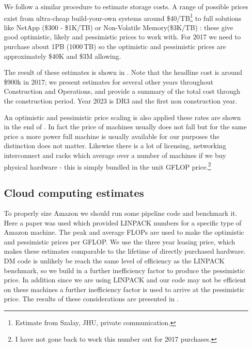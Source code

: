 We follow a similar procedure to estimate storage costs. A range of possible prices exist from ultra-cheap build-your-own systems around \$40/TB\footnote{Estimate from Szalay, JHU, private communication.} to full solutions like NetApp (\$300 - \$1K/TB) or Non-Volatile Memory(\$3K/TB) : these give good optimistic, likely  and pessimistic prices to work with.
For 2017 we need to purchase about 1PB (1000\,TB) so the optimistic and pessimistic prices are approximately \$40K and \$3M allowing.

The result of these estimates is shown in . Note that the headline cost is around \$900k in 2017; we present estimates for several other years throughout Construction and Operations, and provide a summary of the total cost through the construction period. Year 2023 is DR3 and the first non construction year.

An optimistic and pessimistic price scaling is also applied these rates are shown in the end of . In fact the price of machines usually does not fall but for the same price a more power full machine is usually available for our purposes the distinction does not matter.
Likewise there is a lot of licensing, networking interconnect and racks which average over a number of machines if we buy physical hardware - this is simply bundled in the unit GFLOP price.\footnote{I have not gone back to work this number out for 2017 purchases.}

\newpage
\subsection{Cloud computing estimates}



To properly size Amazon we should run some pipeline code and benchmark it. Here a paper \cite{2017arXiv170202968M}  was used which provided LINPACK numbers for a specific type of Amazon machine. The peak and average FLOPs are used to make the optimistic and pessimistic prices per GFLOP.
We use the three year leasing price, which makes these estimates comparable to the lifetime of directly purchased hardware.
DM code is unlikely be reach the same level of efficiency as the LINPACK benchmark, so we build in a further inefficiency factor to produce the pessimistic price.
In addition since we are using LINPACK and our code may not be efficient on these machines a further inefficiency factor is used to arrive at the pessimistic price.
The results of these considerations are presented in .

